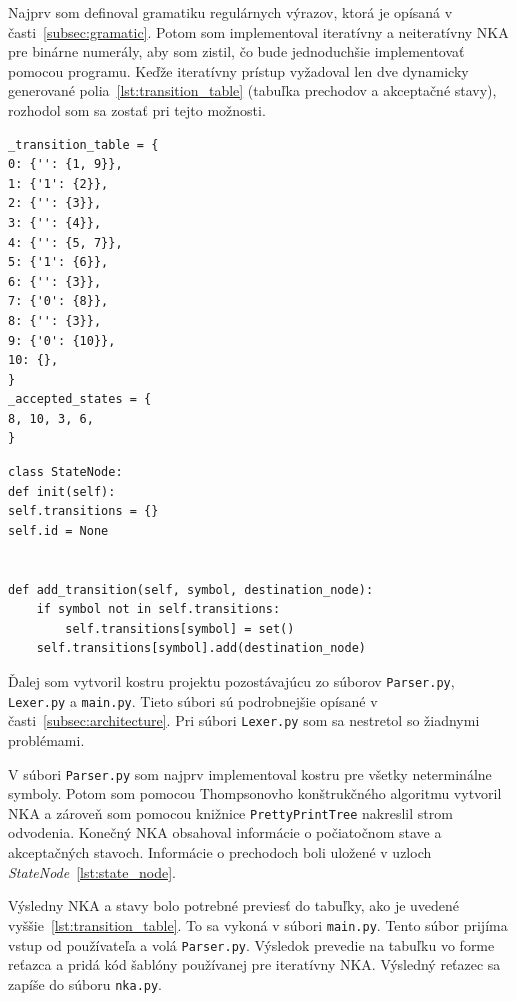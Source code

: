 \documentclass[a4paper,12pt]{article}
\begin{document}
Najprv som definoval gramatiku regulárnych výrazov, ktorá je opísaná v časti~\ref{subsec:gramatic}. Potom som implementoval iteratívny a neiteratívny NKA pre binárne numerály, aby som zistil, čo bude jednoduchšie implementovať pomocou programu. Keďže iteratívny prístup vyžadoval len dve dynamicky generované polia~\ref{lst:transition_table} (tabuľka prechodov a akceptačné stavy), rozhodol som sa zostať pri tejto možnosti.


\lstset{basicstyle=\ttfamily}
\begin{lstlisting}[caption={Dynamicky generované polia}, label={lst:transition_table}]
_transition_table = {
0: {'': {1, 9}},
1: {'1': {2}},
2: {'': {3}},
3: {'': {4}},
4: {'': {5, 7}},
5: {'1': {6}},
6: {'': {3}},
7: {'0': {8}},
8: {'': {3}},
9: {'0': {10}},
10: {},
}
_accepted_states = {
8, 10, 3, 6,
}
\end{lstlisting}


\lstset{basicstyle=\ttfamily}
\begin{lstlisting}[caption={StateNode}, label={lst:state_node}]
class StateNode:
def init(self):
self.transitions = {}
self.id = None


def add_transition(self, symbol, destination_node):
    if symbol not in self.transitions:
        self.transitions[symbol] = set()
    self.transitions[symbol].add(destination_node)

\end{lstlisting}


Ďalej som vytvoril kostru projektu pozostávajúcu zo súborov \texttt{Parser.py}, \texttt{Lexer.py} a \texttt{main.py}. Tieto súbori sú podrobnejšie opísané v časti~\ref{subsec:architecture}. Pri súbori \texttt{Lexer.py} som sa nestretol so žiadnymi problémami.


V súbori \texttt{Parser.py} som najprv implementoval kostru pre všetky neterminálne symboly. Potom som pomocou Thompsonovho konštrukčného algoritmu vytvoril NKA a zároveň som pomocou knižnice \texttt{PrettyPrintTree} nakreslil strom odvodenia. Konečný NKA obsahoval informácie o počiatočnom stave a akceptačných stavoch. Informácie o prechodoch boli uložené v uzloch \textit{StateNode}~\ref{lst:state_node}.


Výsledny NKA a stavy bolo potrebné previesť do tabuľky, ako je uvedené vyššie~\ref{lst:transition_table}. To sa vykoná v súbori \texttt{main.py}. Tento súbor prijíma vstup od používateľa a volá \texttt{Parser.py}. Výsledok prevedie na tabuľku vo forme reťazca a pridá kód šablóny používanej pre iteratívny NKA. Výsledný reťazec sa zapíše do súboru \texttt{nka.py}.
\end{document}
